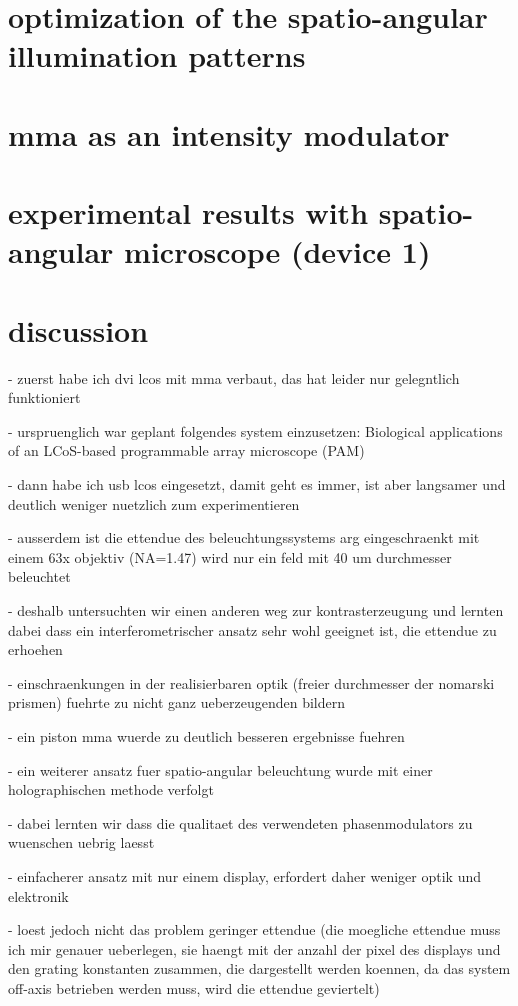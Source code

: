 \documentclass[oneside,a4paper,12pt,BCOR20mm,DIV14]{scrbook} %
\begin{document}
\chapter{optimization of the spatio-angular illumination patterns}
\label{sec:optimization}
\chapter{mma as an intensity modulator}
\label{sec:mma}

\chapter{experimental results with spatio-angular microscope (device 1)}
\label{sec:results}
\chapter{discussion}
\label{sec:discussion}
- zuerst habe ich dvi lcos mit mma verbaut, das hat leider nur
  gelegntlich funktioniert

- urspruenglich war geplant folgendes system einzusetzen: Biological
  applications of an LCoS-based programmable array microscope (PAM)

- dann habe ich usb lcos eingesetzt, damit geht es immer, ist aber
  langsamer und deutlich weniger nuetzlich zum experimentieren

- ausserdem ist die ettendue des beleuchtungssystems arg
  eingeschraenkt mit einem 63x objektiv (NA=1.47) wird nur ein feld
  mit 40 um durchmesser beleuchtet

- deshalb untersuchten wir einen anderen weg zur kontrasterzeugung und
  lernten dabei dass ein interferometrischer ansatz sehr wohl geeignet
  ist, die ettendue zu erhoehen

  - einschraenkungen in der realisierbaren optik (freier durchmesser
    der nomarski prismen) fuehrte zu nicht ganz ueberzeugenden bildern

  - ein piston mma wuerde zu deutlich besseren ergebnisse fuehren

- ein weiterer ansatz fuer spatio-angular beleuchtung wurde mit einer
  holographischen methode verfolgt

  - dabei lernten wir dass die qualitaet des verwendeten
    phasenmodulators zu wuenschen uebrig laesst

  - einfacherer ansatz mit nur einem display, erfordert daher weniger
    optik und elektronik

  - loest jedoch nicht das problem geringer ettendue (die moegliche
    ettendue muss ich mir genauer ueberlegen, sie haengt mit der
    anzahl der pixel des displays und den grating konstanten zusammen,
    die dargestellt werden koennen, da das system off-axis betrieben
    werden muss, wird die ettendue geviertelt)
\end{document}
